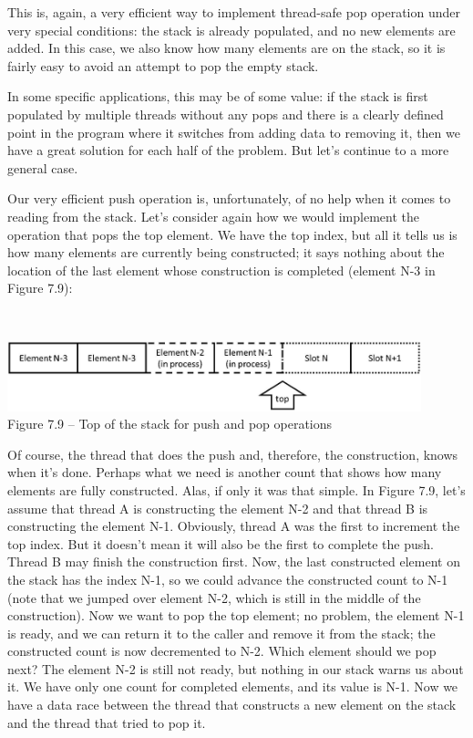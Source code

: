 This is, again, a very efficient way to implement thread-safe pop operation under very special conditions: the stack is already populated, and no new elements are added. In this case, we also know how many elements are on the stack, so it is fairly easy to avoid an attempt to pop the empty stack.

In some specific applications, this may be of some value: if the stack is first populated by multiple threads without any pops and there is a clearly defined point in the program where it switches from adding data to removing it, then we have a great solution for each half of the problem. But let's continue to a more general case.

Our very efficient push operation is, unfortunately, of no help when it comes to reading from the stack. Let's consider again how we would implement the operation that pops the top element. We have the top index, but all it tells us is how many elements are currently being constructed; it says nothing about the location of the last element whose construction is completed (element N-3 in Figure 7.9):

\hspace*{\fill} \\ %
\begin{center}
\includegraphics[width=0.9\textwidth]{content/2/chapter7/images/9.jpg}\\
Figure 7.9 – Top of the stack for push and pop operations
\end{center}

Of course, the thread that does the push and, therefore, the construction, knows when it's done. Perhaps what we need is another count that shows how many elements are fully constructed. Alas, if only it was that simple. In Figure 7.9, let's assume that thread A is constructing the element N-2 and that thread B is constructing the element N-1. Obviously, thread A was the first to increment the top index. But it doesn't mean it will also be the first to complete the push. Thread B may finish the construction first. Now, the last constructed element on the stack has the index N-1, so we could advance the constructed count to N-1 (note that we jumped over element N-2, which is still in the middle of the construction). Now we want to pop the top element; no problem, the element N-1 is ready, and we can return it to the caller and remove it from the stack; the constructed count is now decremented to N-2. Which element should we pop next? The element N-2 is still not ready, but nothing in our stack warns us about it. We have only one count for completed elements, and its value is N-1. Now we have a data race between the thread that constructs a new element on the stack and the thread that tried to pop it.

